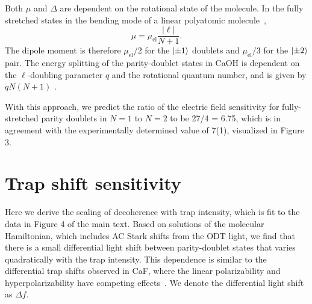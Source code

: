 \documentclass[
superscriptaddress,
twocolumn,
amsmath,amssymb,
aps,
prx,
nofootinbib,
]{revtex4-2}
\begin{document}
Both $\mu$ and $\Delta$ are dependent on the rotational state of the molecule. In the fully stretched states in the bending mode of a linear polyatomic molecule~\cite{Hirota1985},
$$
    \mu = \mu_{\text{el}} \frac{|\ell|}{N+1}.
$$
The dipole moment is therefore $\mu_{\text{el}}/2$ for the $\ket{\pm1}$ doublets and $\mu_{\text{el}}/3$ for the $\ket{\pm 2}$ pair. The energy splitting of the parity-doublet states in CaOH is dependent on the $\ell$-doubling parameter $q$ and the rotational quantum number, and is given by $qN(N+1)$ \cite{coxon1994laser,li1995high}.

With this approach, we predict the ratio of the electric field sensitivity for fully-stretched parity doublets in $N=1$ to $N=2$ to be 27/4 = 6.75, which is in agreement with the experimentally determined value of 7(1), visualized in Figure 3.

\section{Trap shift sensitivity}
Here we derive the scaling of decoherence with trap intensity, which is fit to the data in Figure 4 of the main text. Based on solutions of the molecular Hamiltonian, which includes AC Stark shifts from the ODT light, we find that there is a small differential light shift between parity-doublet states that varies quadratically with the trap intensity. This dependence is similar to the differential trap shifts observed in CaF, where the linear polarizability and hyperpolarizability have competing effects~\cite{Burchesky2021Rotational}. We denote the differential light shift as $\Delta f$.
\end{document}
